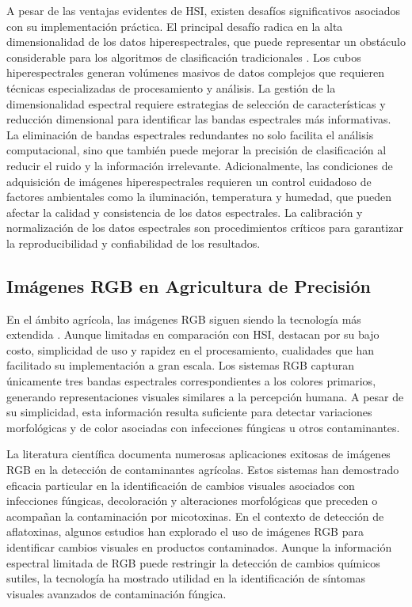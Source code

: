 A pesar de las ventajas evidentes de HSI, existen desafíos significativos asociados con su implementación práctica. El principal desafío radica en la alta dimensionalidad de los datos hiperespectrales, que puede representar un obstáculo considerable para los algoritmos de clasificación tradicionales \cite{HONG201935}. Los cubos hiperespectrales generan volúmenes masivos de datos complejos que requieren técnicas especializadas de procesamiento y análisis. La gestión de la dimensionalidad espectral requiere estrategias de selección de características y reducción dimensional para identificar las bandas espectrales más informativas. La eliminación de bandas espectrales redundantes no solo facilita el análisis computacional, sino que también puede mejorar la precisión de clasificación al reducir el ruido y la información irrelevante. Adicionalmente, las condiciones de adquisición de imágenes hiperespectrales requieren un control cuidadoso de factores ambientales como la iluminación, temperatura y humedad, que pueden afectar la calidad y consistencia de los datos espectrales. La calibración y normalización de los datos espectrales son procedimientos críticos para garantizar la reproducibilidad y confiabilidad de los resultados.

\subsection{Imágenes RGB en Agricultura de Precisión}

En el ámbito agrícola, las imágenes RGB siguen siendo la tecnología más extendida \cite{FERENTINOS2018311}. Aunque limitadas en comparación con HSI, destacan por su bajo costo, simplicidad de uso y rapidez en el procesamiento, cualidades que han facilitado su implementación a gran escala. Los sistemas RGB capturan únicamente tres bandas espectrales correspondientes a los colores primarios, generando representaciones visuales similares a la percepción humana. A pesar de su simplicidad, esta información resulta suficiente para detectar variaciones morfológicas y de color asociadas con infecciones fúngicas u otros contaminantes.

\vspace{5mm}

La literatura científica documenta numerosas aplicaciones exitosas de imágenes RGB en la detección de contaminantes agrícolas. Estos sistemas han demostrado eficacia particular en la identificación de cambios visuales asociados con infecciones fúngicas, decoloración y alteraciones morfológicas que preceden o acompañan la contaminación por micotoxinas. En el contexto de detección de aflatoxinas, algunos estudios han explorado el uso de imágenes RGB para identificar cambios visuales en productos contaminados. Aunque la información espectral limitada de RGB puede restringir la detección de cambios químicos sutiles, la tecnología ha mostrado utilidad en la identificación de síntomas visuales avanzados de contaminación fúngica.

